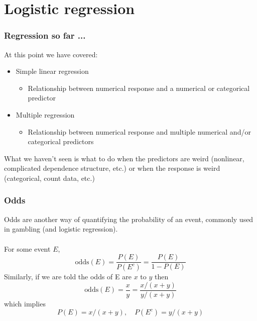 
\section{Logistic regression}


\begin{frame}
\frametitle{Regression so far ...}
    
At this point we have covered:

{\small
\begin{itemize}
\item Simple linear regression
\begin{itemize}
\item Relationship between numerical response and a numerical or categorical predictor
\end{itemize}
\pause
\item Multiple regression
\begin{itemize}
\item Relationship between numerical response and multiple numerical and/or categorical predictors
\end{itemize}
\end{itemize}
}

\pause

What we haven't seen is what to do when the predictors are weird (nonlinear, complicated dependence structure, etc.) or when the response is weird (categorical, count data, etc.)


\end{frame}


\begin{frame}
\frametitle{Odds}

\vspace{-2mm}

Odds are another way of quantifying the probability of an event, commonly used in gambling (and logistic regression).\\

~\\

{
For some event $E$,
{\small
\[\text{odds}(E) = \frac{P(E)}{P(E^c)} = \frac{P(E)}{1-P(E)}\]
}
Similarly, if we are told the odds of E are $x$ to $y$ then
{\small
\[\text{odds}(E) = \frac{x}{y} = \frac{x/(x+y)}{y/(x+y)} \]
}
which implies
{\small
\[P(E) = x/(x+y),\quad P(E^c) = y/(x+y)\]
}
}

\end{frame}

